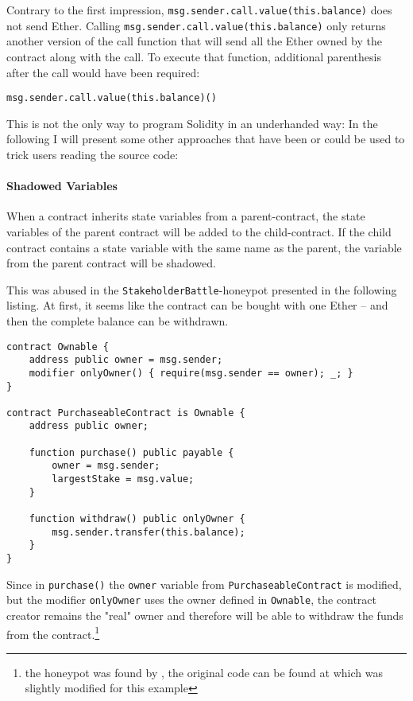 Contrary to the first impression, \texttt{msg.sender.call.value(this.balance)} does not send Ether. Calling \texttt{msg.sender.call.value(this.balance)} only returns another version of the call function that will send all the Ether owned by the contract along with the call. To execute that function, additional parenthesis after the call would have been required:
\begin{verbatim}
msg.sender.call.value(this.balance)()
\end{verbatim}

This is not the only way to program Solidity in an underhanded way: In the following I will present some other approaches that have been or could be used to trick users reading the source code:

\paragraph{Shadowed Variables}
When a contract inherits state variables from a parent-contract, the state variables of the parent contract will be added to the child-contract. If the child contract contains a state variable with the same name as the parent, the variable from the parent contract will be shadowed.

This was abused in the \texttt{StakeholderBattle}-honeypot presented in the following listing. At first, it seems like the contract can be bought with one Ether -- and then the complete balance can be withdrawn.

\begin{verbatim}
contract Ownable {
    address public owner = msg.sender;
    modifier onlyOwner() { require(msg.sender == owner); _; }
}

contract PurchaseableContract is Ownable {
    address public owner;

    function purchase() public payable {
        owner = msg.sender;
        largestStake = msg.value;
    }

    function withdraw() public onlyOwner {
        msg.sender.transfer(this.balance);
    }
}
\end{verbatim}

Since in \texttt{purchase()} the \texttt{owner} variable from \texttt{PurchaseableContract} is modified, but the modifier \texttt{onlyOwner} uses the owner defined in \texttt{Ownable}, the contract creator remains the "real" owner and therefore will be able to withdraw the funds from the contract.\footnote{the honeypot was found by \cite{wagner:honeypots}, the original code can be found at \cite{etherscan:stakeholderbattle} which was slightly modified for this example}

